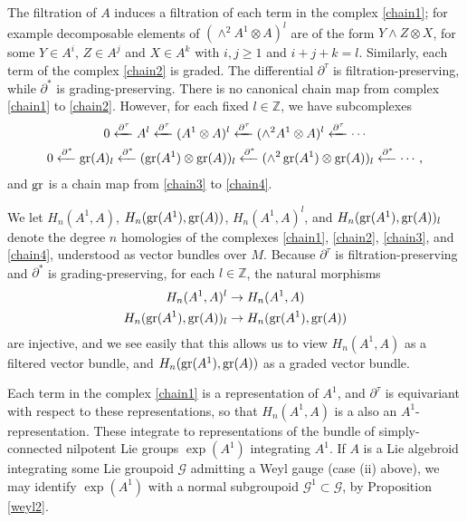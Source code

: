\documentclass[leqno,12pt]{amsart} %
\newcommand{\leftpartial}[1]{\xleftarrow{\partial^{#1}}}
\begin{document}
The filtration of $A$ induces a filtration of each term in the complex \eqref{chain1}; for
example decomposable elements of $(\wedge^2 A^1 \otimes A)^l$ are of the form
$Y\wedge Z \otimes X$, for some $Y\in A^i$, $Z \in A^j$ and $X \in A^k$ with $i, j \ge 1$
and $i + j +k = l$. Similarly, each term of the complex \eqref{chain2} is graded. The
differential $\partial^\tau$ is filtration-preserving, while $\partial^*$ is
grading-preserving. There is no canonical chain map from complex \eqref{chain1} to
\eqref{chain2}. However, for each fixed $l \in {\mathbb Z} $, we have subcomplexes
\begin{gather}
  \label{chain3} 0 \leftpartial{\tau}  A^l \leftpartial{\tau} (A^1\otimes A)^l \leftpartial{\tau} (\wedge^2 A^1 \otimes A)^l \leftpartial{\tau} \cdots \\
  \label{chain4} 0 \leftpartial{*}  \graded(A)_l
  \leftpartial{*} (\graded(A^1) \otimes \graded(A))_l
  \leftpartial{*} (\wedge^2 \graded(A^1) \otimes \graded(A))_l \leftpartial{*} \cdots,
\end{gather}
and $\operatorname{\operatorname{gr}}$ is a chain map from \eqref{chain3} to \eqref{chain4}.

We let $H_n(A^1, A)$, $H_n(\operatorname{\operatorname{gr}}(A^1), \operatorname{\operatorname{gr}}(A))$, $H_n(A^1, A)^l$, and
$H_n(\operatorname{\operatorname{gr}}(A^1),\operatorname{\operatorname{gr}}(A))_l$ denote the degree $n$ homologies of the complexes
\eqref{chain1}, \eqref{chain2}, \eqref{chain3}, and \eqref{chain4}, understood as vector
bundles over $M$. Because $\partial^\tau $ is filtration-preserving and $\partial^*$ is
grading-preserving, for each $l \in {\mathbb Z}$, the natural morphisms
\begin{align*}
  H_n(A^1,A)^l &\rightarrow H_n(A^1,A)\\
  H_n(\operatorname{\operatorname{gr}}(A^1),\operatorname{\operatorname{gr}}(A))_l &\rightarrow H_n(\operatorname{\operatorname{gr}}(A^1),\operatorname{\operatorname{gr}}(A))
\end{align*}
are injective, and we see easily that this allows us to view $H_n(A^1, A)$ as a filtered
vector bundle, and $H_n(\operatorname{\operatorname{gr}}(A^1),\operatorname{\operatorname{gr}}(A))$ as a graded vector bundle.

Each term in the complex \eqref{chain1} is a representation of $A^1$, and $\partial^\tau $
is equivariant with respect to these representations, so that $H_n(A^1, A)$ is a also an
$A^1$-representation.  These integrate to representations of the bundle of
simply-connected nilpotent Lie groups $\exp(A^1)$ integrating $A^1$.  If $A$ is a Lie
algebroid integrating some Lie groupoid ${\mathcal G} $ admitting a Weyl gauge (case (ii)
above), we may identify $\exp(A^1)$ with a normal subgroupoid
${\mathcal G}^1 \subset {\mathcal G} $, by Proposition \ref{weyl2}.
\end{document}
